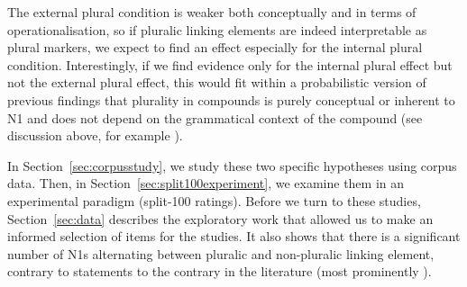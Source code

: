 The external plural condition is weaker both conceptually and in terms of operationalisation, so if pluralic linking elements are indeed interpretable as plural markers, we expect to find an effect especially for the internal plural condition.
Interestingly, if we find evidence only for the internal plural effect but not the external plural effect, this would fit within a probabilistic version of previous findings that plurality in compounds is purely conceptual or inherent to N1 and does not depend on the grammatical context of the compound (see discussion above, for example \citealt{Gallmann1998}).

In Section~\ref{sec:corpusstudy}, we study these two specific hypotheses using corpus data.
Then, in Section~\ref{sec:split100experiment}, we examine them in an experimental paradigm (split-100 ratings).
Before we turn to these studies, Section~\ref{sec:data} describes the exploratory work that allowed us to make an informed selection of items for the studies.
It also shows that there is a significant number of N1s alternating between pluralic and non-pluralic linking element, contrary to statements to the contrary in the literature (most prominently \citealt{NeefBorgwaldt2012,Neef2015}).
